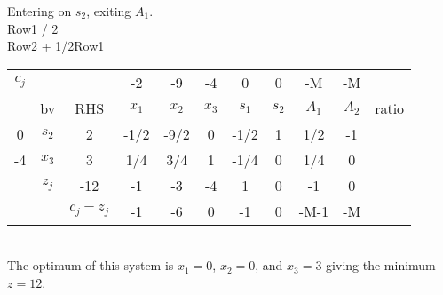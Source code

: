 \documentclass[answers]{exam}
\begin{document}
\noindent
Entering on $s_2$, exiting $A_1$. \\
Row1 / 2 \\
Row2 + 1/2Row1 \\


\begin{tabular}{ccccccccccc}
	$c_j$                   &                            &                                & -2    & -9    & -4    & 0     & 0     & -M    & -M    &       \\
	\multicolumn{1}{c|}{}   & \multicolumn{1}{c|}{bv}    & \multicolumn{1}{c|}{RHS}       & $x_1$ & $x_2$ & $x_3$ & $s_1$ & $s_2$ & $A_1$ & $A_2$ & ratio \\ \cline{1-10}
	\multicolumn{1}{c|}{0}  & \multicolumn{1}{c|}{$s_2$} & \multicolumn{1}{c|}{2}         & -1/2  & -9/2  & 0     & -1/2  & 1     & 1/2   & -1    &       \\
	\multicolumn{1}{c|}{-4} & \multicolumn{1}{c|}{$x_3$} & \multicolumn{1}{c|}{3}         & 1/4   & 3/4   & 1     & -1/4  & 0     & 1/4   & 0     &       \\ \cline{1-10}
	& \multicolumn{1}{c|}{$z_j$} & \multicolumn{1}{c|}{-12}       & -1    & -3    & -4    & 1     & 0     & -1    & 0     &       \\ \cline{3-10}
	&                            & \multicolumn{1}{c|}{$c_j-z_j$} & -1    & -6    & 0     & -1    & 0     & -M-1  & -M    &      
\end{tabular} \\

\noindent
The optimum of this system is $x_1 = 0$, $x_2 = 0$, and $x_3 = 3$ giving the minimum $z = 12$.
\end{document}
